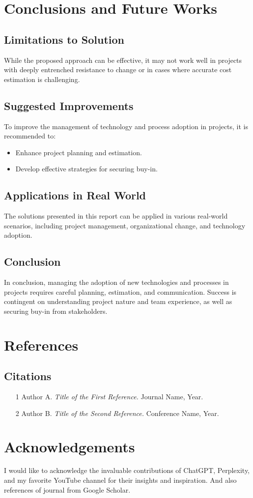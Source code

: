 \documentclass{article}
\begin{document}
\section{Conclusions and Future Works}
\subsection{Limitations to Solution}
While the proposed approach can be effective, it may not work well in projects with deeply entrenched resistance to change or in cases where accurate cost estimation is challenging.
\subsection{Suggested Improvements}
To improve the management of technology and process adoption in projects, it is recommended to:
\begin{itemize}
  \item Enhance project planning and estimation.
  \item Develop effective strategies for securing buy-in.
\end{itemize}
\subsection{Applications in Real World}
The solutions presented in this report can be applied in various real-world scenarios, including project management, organizational change, and technology adoption.
\subsection{Conclusion}
In conclusion, managing the adoption of new technologies and processes in projects requires careful planning, estimation, and communication. Success is contingent on understanding project nature and team experience, as well as securing buy-in from stakeholders.

\section{References}
\subsection{Citations}
\begin{itemize}
  \item [1] Author A. \textit{Title of the First Reference.} Journal Name, Year.
  \item [2] Author B. \textit{Title of the Second Reference.} Conference Name, Year.
\end{itemize}


\section{Acknowledgements}
I would like to acknowledge the invaluable contributions of ChatGPT, Perplexity, and my favorite YouTube channel for their insights and inspiration. And also references of journal from Google Scholar.
\end{document}
